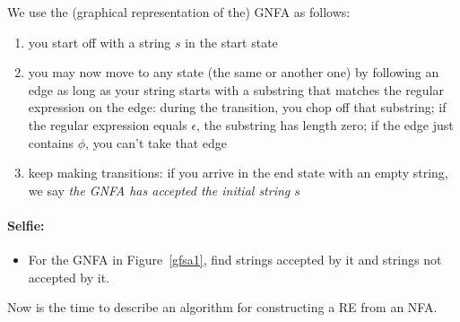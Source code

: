 We use the (graphical representation of the) GNFA as follows:

\begin{enumerate}
\item you start off with a string $s$ in the start state
\item you may now move to any state (the same or another one) by
following an edge as long as your string starts with a substring that
matches the regular expression on the edge: during the transition, you
chop off that substring; if the regular expression equals $\epsilon$,
the substring has length zero; if the edge just contains $\phi$, you
can't take that edge
\item keep making transitions: if you arrive in the end state with an
empty string, we say {\em the GNFA has accepted the initial string $s$}
\end{enumerate}

\paragraph{Selfie:}
\begin{itemize}
\item[]
For the GNFA in Figure~\ref{gfsa1}, find strings accepted by it and
strings not accepted by it.
\end{itemize}


Now is the time to describe an algorithm for constructing a RE from an NFA.


